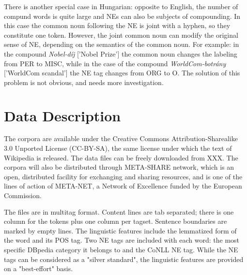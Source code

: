 \documentclass[11pt]{article}
\begin{document}
There is another special case in Hungarian: opposite to English, the number of compund words is quite large and NEs can also be subjects of compounding. In this case the common noun following the NE is joint with a hyphen, so they constitute one token. However, the joint common noun can modify the original sense of NE, depending on the semantics of the common noun. For example: in the compound \textit{Nobel-díj} ['Nobel Prize'] the common noun changes the labeling from PER to MISC, while 
in the case of the compound \textit{WorldCom-botrány} ['WorldCom scandal'] the NE tag changes from ORG to O. The solution of this problem is not obvious, and needs more investigation.



\section{Data Description}
\label{sec:data}

The corpora are available under the Creative Commons Attribution-Sharealike 3.0 Unported License (CC-BY-SA), the same license under which the text of Wikipedia is released. The data files can be freely downloaded from XXX. The corpora will also be distributed through META-SHARE network, which is an open, distributed facility for exchanging and sharing resources, and is one of the lines of action of META-NET, a Network of Excellence funded by the European Commission. 

The files are in multitag format. Content lines are tab separated; there is one column for the tokens plus one column per tagset. Sentence boundaries are marked by empty lines. The linguistic features include the lemmatized form of the word and its POS tag. Two NE tags are included with each word: the most specific DBpedia category it belongs to and the CoNLL NE tag. While the NE tags can be considered as a "silver standard", the linguistic features are provided on a "best-effort" basis.
\end{document}
